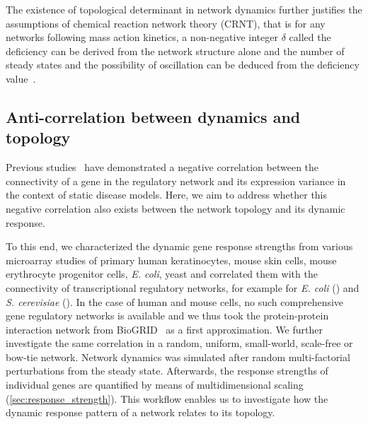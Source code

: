 The existence of topological determinant in network dynamics
further justifies the assumptions of chemical reaction network
theory (CRNT), that is for any networks following mass action kinetics,
a non-negative integer $\delta$ called the
deficiency can be derived from the network structure
alone and the number of steady states and the possibility of 
oscillation can be deduced from the deficiency value~\citep{Conradi2005}.

\subsection{Anti-correlation between dynamics and topology}
\label{sec:anti-correlation}
Previous studies~\citep{Lu2007a,Mar2011} have demonstrated a negative
correlation between the connectivity of a gene in the regulatory network
and its expression variance in the context of static disease models.
Here, we aim to address whether this negative correlation also exists 
between the network topology and its dynamic response.

To this end, we characterized the dynamic gene response strengths from 
various microarray studies of primary human keratinocytes, mouse skin
cells, mouse erythrocyte progenitor cells, \emph{E. coli}, yeast and
correlated them with the connectivity of
transcriptional regulatory networks, for example for \emph{E. coli} 
(\citealp{Gama-Castro2008}) 
and \emph{S. cerevisiae} (\citealp{Balaji2006}). In the case of human and
mouse cells, no such comprehensive gene regulatory networks is available
and we thus took the protein-protein interaction network from BioGRID~%
\citep{Stark2006} as a first approximation. 
We further investigate the same correlation in a random,
uniform, small-world, scale-free or bow-tie network. Network dynamics was simulated after 
random 
multi-factorial perturbations from the steady state. Afterwards, the response 
strengths of individual genes are quantified by means of multidimensional 
scaling (\ref{sec:response_strength}). 
This workflow enables us to investigate how the dynamic
response pattern of a network relates to its topology. 

